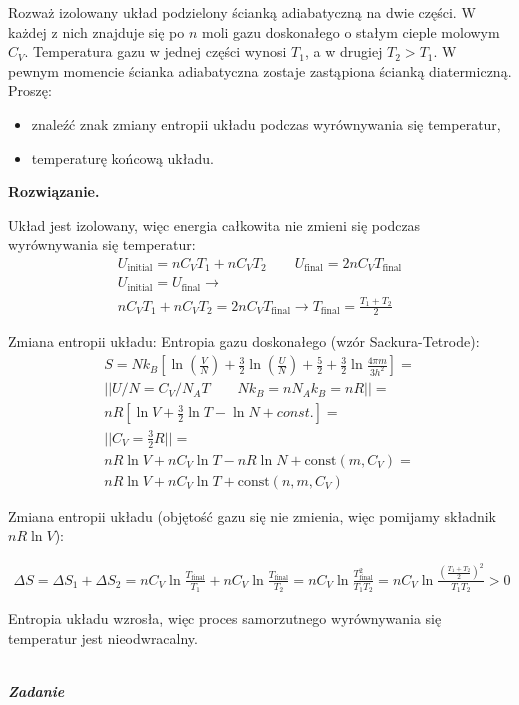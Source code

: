 \documentclass[11pt,a4paper]{article}
\newcounter{zadanie}\newcommand{\zadanie}[1][]{\addtocounter{zadanie}{1} ~\\ {\bf \emph{Zadanie \arabic{zadanie} #1 }} \\}
\newenvironment{solution}{\vspace{1cm} \par\textbf{Rozwiązanie.} \vspace{1cm}}{}
\begin{document}
Rozważ izolowany układ podzielony ścianką adiabatyczną na dwie części. 
W każdej z nich znajduje się po $n$ moli gazu doskonałego o stałym cieple molowym $C_V$. 
Temperatura gazu w jednej części wynosi $T_1$, a w drugiej $T_2 > T_1$. W pewnym momencie ścianka 
adiabatyczna zostaje zastąpiona ścianką diatermiczną. Proszę:
\begin{itemize}
  \item znaleźć znak zmiany entropii  układu podczas wyrównywania się temperatur,
  \item temperaturę końcową układu.
\end{itemize}

\begin{solution}

Układ jest izolowany, więc energia całkowita nie zmieni się podczas wyrównywania się temperatur:
\begin{align*}
  U_{\text{initial}} =  n C_V T_1 + n C_V T_2 \qquad
  U_{\text{final}} = 2 n C_V T_{\text{final}} \\
  U_{\text{initial}} = U_{\text{final}} \to \\
  n C_V T_1 + n C_V T_2 = 2 n C_V T_{\text{final}} \to 
  T_{\text{final}} = \frac{T_1 + T_2}{2}
\end{align*}

Zmiana entropii układu:
Entropia gazu doskonałego (wzór Sackura-Tetrode):
\begin{align*}
  S = N k_B \left[ \ln \left( \frac{V}{N} \right) + 
    \frac{3}{2} \ln \left( \frac{U}{N} \right) + \frac{5}{2} +
    \frac{3}{2} \ln \frac{4 \pi m}{3 h^{2}} \right] = \\
  || U/N = C_V/N_A T \qquad N k_B = nN_A k_B = nR  || =  \\
  n R \left[ \ln V + \frac{3}{2} \ln T - \ln N + const. \right]  = \\
  || C_V = \frac{3}{2} R || = \\
  n R \ln V + n C_V \ln T - n R \ln N + \text{const}(m, C_V) = \\
  n R \ln V + n C_V \ln T + \text{const}(n, m, C_V)
\end{align*}

Zmiana entropii układu (objętość gazu się nie zmienia, więc 
pomijamy składnik $n R \ln V$):

\begin{align*}
  \Delta S = \Delta S_1 + \Delta S_2 =
  n C_V \ln \frac{T_{\text{final}}}{T_1} + n C_V \ln \frac{T_{\text{final}}}{T_2} = 
  n C_V \ln \frac{T_{\text{final}}^2}{T_1 T_2} = 
  n C_V \ln \frac{(\frac{T_1 + T_2}{2})^2}{T_1 T_2} > 0
\end{align*}

Entropia układu wzrosła, więc proces samorzutnego wyrównywania się temperatur jest nieodwracalny.


\newpage   
\end{solution}
\zadanie[]
\end{document}
